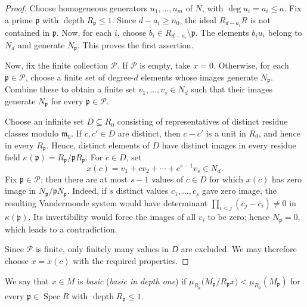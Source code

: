 \documentclass[11pt,letterpaper]{amsart}
\newcommand{\x}{\xrightarrow{}}
\DeclareMathOperator{\Spec}{Spec}
\DeclareMathOperator{\depth}{depth}
\theoremstyle{plain}
\theoremstyle{definition}
\theoremstyle{remark}
\begin{document}
\begin{proof}
Choose homogeneous generators $u_1,\ldots,u_m$ of $N$, with
$\deg u_i=a_i\le a$. Fix a prime $\mathfrak p$ with
$\operatorname{depth}R_{\mathfrak p}\le1$. Since $d-a_i\ge n_0$,
the ideal $R_{d-a_i}R$ %
is not contained in $\mathfrak p$. Now, for each $i$,
choose $b_i\in R_{d-a_i}\setminus\mathfrak p$. The elements
$b_iu_i$ belong to $N_d$ and generate $N_{\mathfrak p}$.%
This proves the first assertion.

Now, fix the finite collection $\mathcal P$. If $\mathcal P$ is
empty, take $x=0$. Otherwise, for each $\mathfrak p\in\mathcal P$,
choose a finite set of degree-$d$ elements
whose images generate $N_\mathfrak p$. Combine
these to obtain a finite set  $v_1,\ldots,v_s\in N_d$ such that their images
generate $N_{\mathfrak p}$ for every $\mathfrak p\in\mathcal P$.

Choose an infinite set $D\subseteq R_0$ consisting of
representatives of distinct residue classes modulo
$\mathfrak m_0$. If $c,c'\in D$ are distinct, then $c-c'$ is a unit
in $R_0$, and hence in every $R_{\mathfrak p}$. Hence, distinct elements
of $D$ have distinct images in every residue field
$\kappa(\mathfrak p)=R_{\mathfrak p}/\mathfrak pR_{\mathfrak p}$.
For $c\in D$, set
\[
x(c)=v_1+cv_2+\cdots+c^{s-1}v_s\in N_d.
\]
Fix $\mathfrak p\in\mathcal P$; then there are at most $s-1$ values of
$c\in D$ for which $x(c)$ has zero image in
$N_{\mathfrak p}/\mathfrak pN_{\mathfrak p}$. Indeed, if $s$
distinct values $c_1,\ldots,c_s$ gave zero image, the resulting
Vandermonde system would have determinant
$\prod_{i<j}(\overline c_j-\overline c_i)\ne0$ in
$\kappa(\mathfrak p)$. Its invertibility would force the images
of all $v_i$ to be zero; hence $N_\mathfrak p=0$, which leads to a contradiction.

Since $\mathcal P$ is finite, only finitely many values in $D$
are excluded. We may therefore choose $x=x(c)$ with the required properties. 
\end{proof} 

 We say that \(x\in M\) is \emph{basic} (\emph{basic in depth one}) if $\mu_{R_\mathfrak p}\bigl(M_\mathfrak p/R_\mathfrak px\bigr)<\mu_{R_\mathfrak p}(M_\mathfrak p)$ for every \(\mathfrak p\in\Spec R\) with \(\depth R_\mathfrak p\leq1\). 
\end{document}
